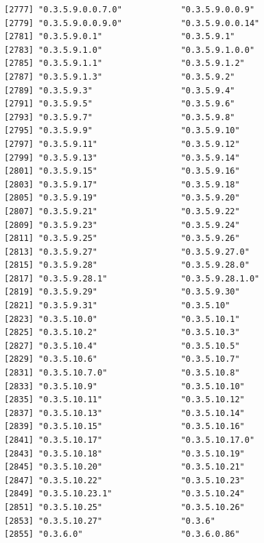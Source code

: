 \documentclass[
  letterpaper,
  DIV=11,
  numbers=noendperiod]{scrreprt}
\begin{document}
\begin{verbatim}
[2777] "0.3.5.9.0.0.7.0"            "0.3.5.9.0.0.9"             
[2779] "0.3.5.9.0.0.9.0"            "0.3.5.9.0.0.14"            
[2781] "0.3.5.9.0.1"                "0.3.5.9.1"                 
[2783] "0.3.5.9.1.0"                "0.3.5.9.1.0.0"             
[2785] "0.3.5.9.1.1"                "0.3.5.9.1.2"               
[2787] "0.3.5.9.1.3"                "0.3.5.9.2"                 
[2789] "0.3.5.9.3"                  "0.3.5.9.4"                 
[2791] "0.3.5.9.5"                  "0.3.5.9.6"                 
[2793] "0.3.5.9.7"                  "0.3.5.9.8"                 
[2795] "0.3.5.9.9"                  "0.3.5.9.10"                
[2797] "0.3.5.9.11"                 "0.3.5.9.12"                
[2799] "0.3.5.9.13"                 "0.3.5.9.14"                
[2801] "0.3.5.9.15"                 "0.3.5.9.16"                
[2803] "0.3.5.9.17"                 "0.3.5.9.18"                
[2805] "0.3.5.9.19"                 "0.3.5.9.20"                
[2807] "0.3.5.9.21"                 "0.3.5.9.22"                
[2809] "0.3.5.9.23"                 "0.3.5.9.24"                
[2811] "0.3.5.9.25"                 "0.3.5.9.26"                
[2813] "0.3.5.9.27"                 "0.3.5.9.27.0"              
[2815] "0.3.5.9.28"                 "0.3.5.9.28.0"              
[2817] "0.3.5.9.28.1"               "0.3.5.9.28.1.0"            
[2819] "0.3.5.9.29"                 "0.3.5.9.30"                
[2821] "0.3.5.9.31"                 "0.3.5.10"                  
[2823] "0.3.5.10.0"                 "0.3.5.10.1"                
[2825] "0.3.5.10.2"                 "0.3.5.10.3"                
[2827] "0.3.5.10.4"                 "0.3.5.10.5"                
[2829] "0.3.5.10.6"                 "0.3.5.10.7"                
[2831] "0.3.5.10.7.0"               "0.3.5.10.8"                
[2833] "0.3.5.10.9"                 "0.3.5.10.10"               
[2835] "0.3.5.10.11"                "0.3.5.10.12"               
[2837] "0.3.5.10.13"                "0.3.5.10.14"               
[2839] "0.3.5.10.15"                "0.3.5.10.16"               
[2841] "0.3.5.10.17"                "0.3.5.10.17.0"             
[2843] "0.3.5.10.18"                "0.3.5.10.19"               
[2845] "0.3.5.10.20"                "0.3.5.10.21"               
[2847] "0.3.5.10.22"                "0.3.5.10.23"               
[2849] "0.3.5.10.23.1"              "0.3.5.10.24"               
[2851] "0.3.5.10.25"                "0.3.5.10.26"               
[2853] "0.3.5.10.27"                "0.3.6"                     
[2855] "0.3.6.0"                    "0.3.6.0.86"                

\end{verbatim}
\end{document}
